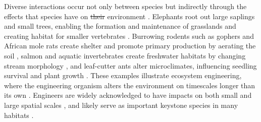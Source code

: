 \documentclass[twocolumn,preprintnumbers,amsmath,amssymb,superscriptaddress,linenumbers]{revtex4-1}
\providecommand{\DIFadd}[1]{{\protect\color{blue}\uwave{#1}}} %
\providecommand{\DIFdel}[1]{{\protect\color{red}\sout{#1}}}                      %
\providecommand{\DIFaddbegin}{} %
\providecommand{\DIFaddend}{} %
\providecommand{\DIFdelbegin}{} %
\providecommand{\DIFdelend}{} %
\newcommand{\DIFscaledelfig}{0.5}
\newlength{\DIFdelgraphicswidth} %
\newlength{\DIFdelgraphicsheight} %
\newcommand{\DIFaddincludegraphics}[2][]{{\color{blue}\fbox{\DIFOincludegraphics[#1]{#2}}}} %
\newcommand{\DIFdelincludegraphics}[2][]{%
\sbox{\DIFdelgraphicsbox}{\DIFOincludegraphics[#1]{#2}}%
\settoboxwidth{\DIFdelgraphicswidth}{\DIFdelgraphicsbox} %
\settoboxtotalheight{\DIFdelgraphicsheight}{\DIFdelgraphicsbox} %
\scalebox{\DIFscaledelfig}{%
\parbox[b]{\DIFdelgraphicswidth}{\usebox{\DIFdelgraphicsbox}\\[-\baselineskip] \rule{\DIFdelgraphicswidth}{0em}}\llap{\resizebox{\DIFdelgraphicswidth}{\DIFdelgraphicsheight}{%
\setlength{\unitlength}{\DIFdelgraphicswidth}%
\begin{picture}(1,1)%
\thicklines\linethickness{2pt} %
{\color[rgb]{1,0,0}\put(0,0){\framebox(1,1){}}}%
{\color[rgb]{1,0,0}\put(0,0){\line( 1,1){1}}}%
{\color[rgb]{1,0,0}\put(0,1){\line(1,-1){1}}}%
\end{picture}%
}\hspace*{3pt}}} %
} %
\DeclareRobustCommand{\DIFaddbegin}{\DIFOaddbegin \let\includegraphics\DIFaddincludegraphics} %
\DeclareRobustCommand{\DIFaddend}{\DIFOaddend \let\includegraphics\DIFOincludegraphics} %
\DeclareRobustCommand{\DIFdelbegin}{\DIFOdelbegin \let\includegraphics\DIFdelincludegraphics} %
\DeclareRobustCommand{\DIFdelend}{\DIFOaddend \let\includegraphics\DIFOincludegraphics} %
\begin{document}


Diverse interactions occur not only between species but indirectly through the effects that species have on \DIFdelbegin \DIFdel{their }\DIFdelend \DIFaddbegin \DIFadd{the abiotic }\DIFaddend environment \cite{Jones1994,Olff2009,OdlingSmee2013}.
Elephants root out large saplings and small trees, enabling the formation and maintenance of grasslands \cite{Leuthold1996,Haynes2012} and creating habitat for smaller vertebrates \cite{Pringle2008}.
Burrowing rodents such as gophers and African mole rats create shelter and promote primary production by aerating the soil \cite{Reichman2002,Hagenah2013}, salmon and aquatic invertebrates create freshwater habitats by changing stream morphology \cite{Moore2006}, and leaf-cutter ants alter microclimates, influencing seedling survival and plant growth \cite{Meyer2011}.
These examples illustrate ecosystem engineering, where the engineering organism alters the environment on timescales longer than its own \cite{Hastings2007}.
Engineers are widely acknowledged to have impacts on both small and large spatial scales \cite{Wright2006b}, and likely serve as important keystone species in many habitats \cite{Jones2012}.
\end{document}
